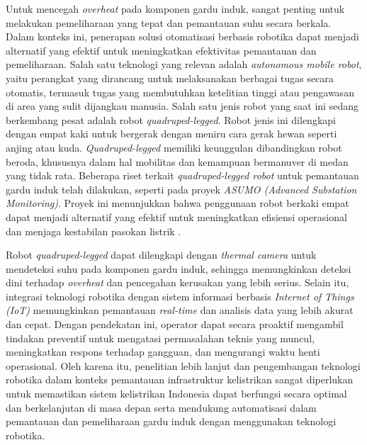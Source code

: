 Untuk mencegah \emph{overheat} pada komponen gardu induk, sangat penting untuk melakukan pemeliharaan yang tepat dan pemantauan suhu secara berkala. Dalam konteks ini, penerapan solusi otomatisasi berbasis robotika dapat menjadi alternatif yang efektif untuk meningkatkan efektivitas pemantauan dan pemeliharaan. Salah satu teknologi yang relevan adalah \emph{autonomous mobile robot}, yaitu perangkat yang dirancang untuk melaksanakan berbagai tugas secara otomatis, termasuk tugas yang membutuhkan ketelitian tinggi atau pengawasan di area yang sulit dijangkau manusia. Salah satu jenis robot yang saat ini sedang berkembang pesat adalah robot \emph{quadruped-legged}. Robot jenis ini dilengkapi dengan empat kaki untuk bergerak dengan meniru cara gerak hewan seperti anjing atau kuda. \emph{Quadruped-legged} memiliki keunggulan dibandingkan robot beroda, khususnya dalam hal mobilitas dan kemampuan bermanuver di medan yang tidak rata. Beberapa riset terkait \emph{quadruped-legged robot} untuk pemantauan gardu induk telah dilakukan, seperti pada proyek \emph{ASUMO (Advanced Substation Monitoring)}. Proyek ini menunjukkan bahwa penggunaan robot berkaki empat dapat menjadi alternatif yang efektif untuk meningkatkan efisiensi operasional dan menjaga kestabilan pasokan listrik \cite{ASUMO2023}.  

Robot \emph{quadruped-legged}  dapat dilengkapi dengan \emph{thermal camera} untuk mendeteksi suhu pada komponen gardu induk, sehingga memungkinkan deteksi dini terhadap \emph{overheat} dan pencegahan kerusakan yang lebih serius. Selain itu, integrasi teknologi robotika dengan sistem informasi berbasis \emph{Internet of Things (IoT)} memungkinkan pemantauan \emph{real-time} dan analisis data yang lebih akurat dan cepat. Dengan pendekatan ini, operator dapat secara proaktif mengambil tindakan preventif untuk mengatasi permasalahan teknis yang muncul, meningkatkan respons terhadap gangguan, dan mengurangi waktu henti operasional. Oleh karena itu, penelitian lebih lanjut dan pengembangan teknologi robotika dalam konteks pemantauan infrastruktur kelistrikan sangat diperlukan untuk memastikan sistem kelistrikan Indonesia dapat berfungsi secara optimal dan berkelanjutan di masa depan serta mendukung automatisasi dalam pemantauan dan pemeliharaan gardu induk dengan menggunakan teknologi robotika.

